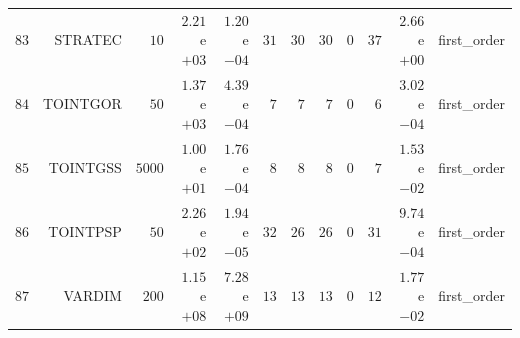 \begin{longtable}{rrrrrrrrrrrr}
  \(    83\) & STRATEC & \(    10\) & \( 2.21\)e\(+03\) & \( 1.20\)e\(-04\) & \(    31\) & \(    30\) & \(    30\) & \(     0\) & \(    37\) & \( 2.66\)e\(+00\) & first\_order \\
  \(    84\) & TOINTGOR & \(    50\) & \( 1.37\)e\(+03\) & \( 4.39\)e\(-04\) & \(     7\) & \(     7\) & \(     7\) & \(     0\) & \(     6\) & \( 3.02\)e\(-04\) & first\_order \\
  \(    85\) & TOINTGSS & \(  5000\) & \( 1.00\)e\(+01\) & \( 1.76\)e\(-04\) & \(     8\) & \(     8\) & \(     8\) & \(     0\) & \(     7\) & \( 1.53\)e\(-02\) & first\_order \\
  \(    86\) & TOINTPSP & \(    50\) & \( 2.26\)e\(+02\) & \( 1.94\)e\(-05\) & \(    32\) & \(    26\) & \(    26\) & \(     0\) & \(    31\) & \( 9.74\)e\(-04\) & first\_order \\
  \(    87\) & VARDIM & \(   200\) & \( 1.15\)e\(+08\) & \( 7.28\)e\(+09\) & \(    13\) & \(    13\) & \(    13\) & \(     0\) & \(    12\) & \( 1.77\)e\(-02\) & first\_order \\\hline
\end{longtable}
